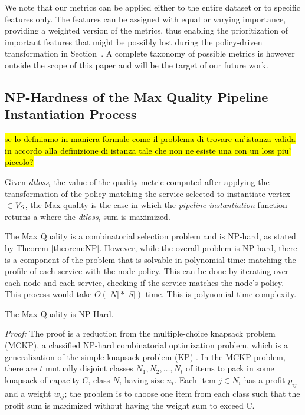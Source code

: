 \vspace{0.5em}

We note that our metrics can be applied either to the entire dataset or to specific features only. The features can be assigned with equal or varying importance, providing a weighted version of the metrics, thus enabling the prioritization of important features that might be possibly lost during the policy-driven transformation in Section~\cite{ADD}. A complete taxonomy of possible metrics is however outside the scope of this paper and will be the target of our future work.

\subsection{NP-Hardness of the Max Quality Pipeline Instantiation Process}\label{sec:nphard}
\hl{se lo definiamo in maniera formale come il problema di trovare un'istanza valida in accordo alla definizione di istanza tale che non ne esiste una con un loss piu' piccolo?}

\begin{definition}\label{def:MaXQualityInstance}
  Given \textit{dtloss}$_i$ the value of the quality metric computed after applying the transformation of the policy matching the service selected to instantiate vertex  $\in$$V_S$, the Max quality \problem is the case in which the \emph{pipeline instantiation} function returns a \pipelineInstance where the \textit{dtloss}$_i$ sum is maximized.
\end{definition}

The Max Quality \problem is a combinatorial selection problem and is NP-hard, as stated by Theorem \ref{theorem:NP}. However, while the overall problem is NP-hard, there is a component of the problem that is solvable in polynomial time: matching the profile of each service with the node policy. This can be done by iterating over each node and each service, checking if the service matches the node’s policy. This process would take $O(|N|*|S|)$ time. This is polynomial time complexity.

\begin{theorem}\label{theorem:NP}
  The Max Quality  \problem is NP-Hard.
\end{theorem}
\emph{Proof: }
The proof is a reduction from the multiple-choice knapsack problem (MCKP), a classified NP-hard combinatorial optimization problem, which is a generalization of the simple knapsack problem (KP) \cite{}. In the MCKP problem, there are $t$ mutually disjoint classes $N_1,N_2,\ldots,N_t$ of items to pack in some knapsack of capacity $C$, class $N_i$ having size $n_i$. Each item $j$$\in$$N_i$ has a profit $p_{ij}$ and a weight $w_{ij}$; the problem is to choose one item from each class such that the profit sum is maximized without having the weight sum to exceed C.

